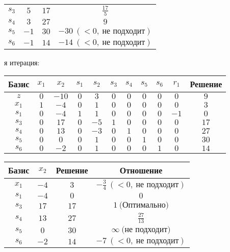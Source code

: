 \documentclass{article}%
\begin{document}
\begin{flushleft}
\begin{tabular}{|cccc|}
$s_{3}$&$5$&$17$&$\frac{17}{5}$\\%
$s_{4}$&$3$&$27$&$9$\\%
$s_{5}$&$-1$&$30$&$-30\: (< 0, \: \text{не подходит})$\\%
$s_{6}$&$-1$&$14$&$-14\: (< 0, \: \text{не подходит})$\\%
\hline%
\end{tabular}%
\newline%
\newline%
я итерация: %
\newline%
\newline%
\renewcommand{\arraystretch}{1.3}%
\begin{tabular}{|c|ccccccccc|c|}%
\hline%
Базис&$x_{1}$&$x_{2}$&$s_{1}$&$s_{2}$&$s_{3}$&$s_{4}$&$s_{5}$&$s_{6}$&$r_{1}$&Решение\\%
\hline%
$z$&$0$&$-10$&$0$&$3$&$0$&$0$&$0$&$0$&$0$&$9$\\%
\hline%
$x_{1}$&$1$&$-4$&$0$&$1$&$0$&$0$&$0$&$0$&$0$&$3$\\%
$s_{1}$&$0$&$-4$&$1$&$1$&$0$&$0$&$0$&$0$&$-1$&$0$\\%
$s_{3}$&$0$&$17$&$0$&$-5$&$1$&$0$&$0$&$0$&$0$&$17$\\%
$s_{4}$&$0$&$13$&$0$&$-3$&$0$&$1$&$0$&$0$&$0$&$27$\\%
$s_{5}$&$0$&$0$&$0$&$1$&$0$&$0$&$1$&$0$&$0$&$30$\\%
$s_{6}$&$0$&$-2$&$0$&$1$&$0$&$0$&$0$&$1$&$0$&$14$\\%
\hline%
\end{tabular}%
\newline%
\newline%
\newline%
\begin{tabular}{|cccc|}%
\hline%
Базис&$x_{2}$&Решение&Отношение\\%
\hline%
$x_{1}$&$-4$&$3$&$-\frac{3}{4}\: (< 0, \: \text{не подходит})$\\%
$s_{1}$&$-4$&$0$&$0$\\%
$s_{3}$&$17$&$17$&$1\: \text{(Оптимально)}$\\%
$s_{4}$&$13$&$27$&$\frac{27}{13}$\\%
$s_{5}$&$0$&$30$&$\infty \: \text{(не подходит)}$\\%
$s_{6}$&$-2$&$14$&$-7\: (< 0, \: \text{не подходит})$\\%
\hline%
\end{tabular}%
\newline%
\newline%

\end{flushleft}
\end{document}
